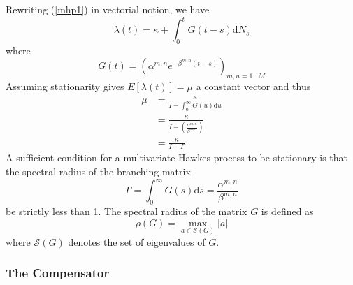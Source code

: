 \documentclass{amsart}
\newcommand{\mathd}{\mathrm{d}}
\begin{document}
Rewriting (\ref{mhp1}) in vectorial notion, we have
\begin{equation}
  \lambda ( t) = \kappa + \int_0^t G ( t - s) \mathd N_s
\end{equation}
where
\begin{equation}
  G ( t) = (\alpha^{m, n} e^{- \beta^{m, n} ( t - s)})_{m, n = 1 \ldots M}
\end{equation}
Assuming stationarity gives $E [ \lambda ( t)] = \mu$ a constant vector and
thus
\begin{equation}
  \begin{array}{ll}
    \mu & = \frac{\kappa}{I - \int_0^{\infty} G ( u) \mathd u}\\
    & = \frac{\kappa}{I - ( \frac{\alpha^{m, n}}{\beta^{m, n}})}\\
    & = \frac{\kappa}{I - \Gamma}
  \end{array}
\end{equation}
A sufficient condition for a multivariate Hawkes process to be stationary is
that the spectral radius of the branching matrix
\begin{equation}
  \Gamma = \int_0^{\infty} G ( s) \mathd s = \frac{\alpha^{m, n}}{\beta^{m,
  n}}
\end{equation}
be strictly less than 1. The spectral radius of the matrix $G$ is defined as
\begin{equation}
  \rho ( G) = \max_{a \in \mathcal{S} ( G)} | a |
\end{equation}
where $\mathcal{S} ( G)$ denotes the set of eigenvalues of $G$.

\subsubsection{The Compensator}
\end{document}
